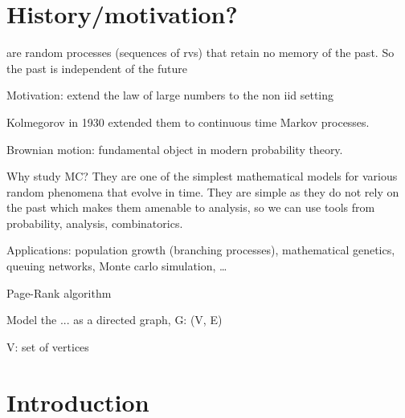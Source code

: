 \section{History/motivation?}
 are random processes (sequences of rvs) that retain no memory of the past.
So the past is independent of the future

Motivation: extend the law of large numbers to the non iid setting

Kolmegorov in 1930 extended them to continuous time Markov processes.

Brownian motion: fundamental object in modern probability theory.

Why study MC?
They are one of the simplest mathematical models for various random phenomena that evolve in time.
They are simple as they do not rely on the past which makes them amenable to analysis, so we can use tools from probability, analysis, combinatorics.

Applications: population growth (branching processes), mathematical genetics, queuing networks, Monte carlo simulation, \dots

Page-Rank algorithm

Model the ... as a directed graph, G: (V, E)

V: set of vertices

\section{Introduction}

